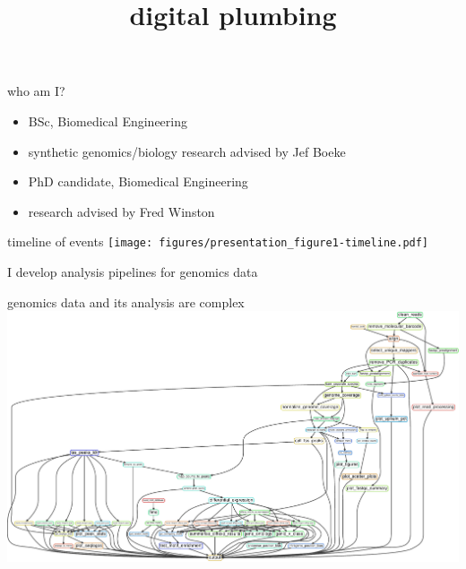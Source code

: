 \documentclass[aspectratio=169]{beamer}
\title{digital plumbing}
\begin{document}
\begin{frame}
    \titlepage
\end{frame}

\begin{frame}{who am I?}
    \begin{description}[align=right]
        \setlength{\itemsep}{1cm}
        \item[undergrad:]
            \begin{itemize}
                \item BSc, Biomedical Engineering
                \item synthetic genomics/biology research advised by Jef Boeke
            \end{itemize}
        \item[currently:]
            \begin{itemize}
                \item PhD candidate, Biomedical Engineering
                \item research advised by Fred Winston
            \end{itemize}
    \end{description}
\end{frame}

\begin{frame}{timeline of events}
\texttt{[image: figures/presentation\_figure1-timeline.pdf]}
\end{frame}

\begin{frame}{I develop analysis pipelines for genomics data}
\end{frame}

\begin{frame}{genomics data and its analysis are complex}
\includegraphics[width=\textwidth]{figures/rulegraph.pdf}
\end{frame}
\end{document}
